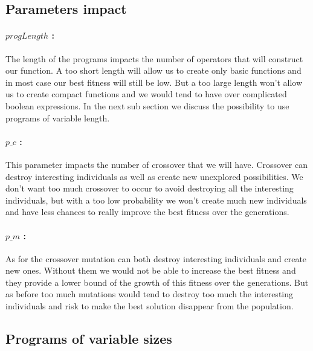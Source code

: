 \documentclass[14pt]
{article}
\begin{document}
\subsection{Parameters impact}
\paragraph*{$progLength$ :} The length of the programs impacts the number of operators that will construct our function. A too short length will allow us to create only basic functions and in most case our best fitness will still be low. But a too large length won't allow us to create compact functions and we would tend to have over complicated boolean expressions. In the next sub section we discuss the possibility to use programs of variable length. \\

\paragraph*{$p\_c$ :} This parameter impacts the number of crossover that we will have. Crossover can destroy interesting individuals as well as create new unexplored possibilities. We don't want too much crossover to occur to avoid destroying all the interesting individuals, but with a too low probability we won't create much new individuals and have less chances to really improve the best fitness over the generations.

\paragraph*{$p\_m$ :} As for the crossover mutation can both destroy interesting individuals and create new ones. Without them we would not be able to increase the best fitness and they provide a lower bound of the growth of this fitness over the generations. But as before too much mutations would tend to destroy too much the interesting individuals and risk to make the best solution disappear from the population.


\subsection{Programs of variable sizes}
\end{document}
